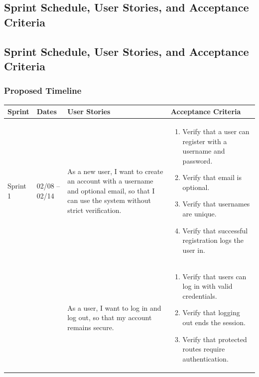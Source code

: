 \documentclass[12pt]{article}
\begin{document}
\subsection{Sprint Schedule, User Stories, and Acceptance Criteria}

\vspace{2em}

\subsection{Sprint Schedule, User Stories, and Acceptance Criteria}

\vspace{0.5em}
\subsubsection{Proposed Timeline}


\vspace{0.5em}

\noindent
\begin{tabular}{|L{1.2cm}|L{1.8cm}|L{5.2cm}|L{6.3cm}|}
\hline
\textbf{Sprint} & \textbf{Dates} & \textbf{User Stories} & \textbf{Acceptance Criteria} \\
\hline
Sprint 1 & 02/08 -- 02/14 &
As a new user, I want to create an account with a username and optional email, so that I can use the system without strict verification. &
\begin{enumerate}
    \item Verify that a user can register with a username and password.
    \item Verify that email is optional.
    \item Verify that usernames are unique.
    \item Verify that successful registration logs the user in.
\end{enumerate} \\
& &
As a user, I want to log in and log out, so that my account remains secure. &
\begin{enumerate}
    \item Verify that users can log in with valid credentials.
    \item Verify that logging out ends the session.
    \item Verify that protected routes require authentication.
\end{enumerate} \\
\hline
\end{tabular}
\end{document}
